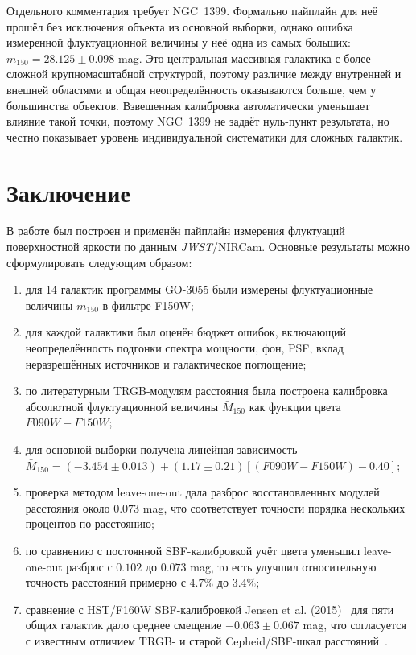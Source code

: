 \documentclass[12pt,a4paper]{article}
\begin{document}
Отдельного комментария требует NGC~1399. Формально пайплайн для неё прошёл без исключения объекта из основной выборки, однако ошибка измеренной флуктуационной величины у неё одна из самых больших: $\bar{m}_{150}=28.125\pm0.098$ mag. Это центральная массивная галактика с более сложной крупномасштабной структурой, поэтому различие между внутренней и внешней областями и общая неопределённость оказываются больше, чем у большинства объектов. Взвешенная калибровка автоматически уменьшает влияние такой точки, поэтому NGC~1399 не задаёт нуль-пункт результата, но честно показывает уровень индивидуальной систематики для сложных галактик.

\section{Заключение}

В работе был построен и применён пайплайн измерения флуктуаций поверхностной яркости по данным \textit{JWST}/NIRCam. Основные результаты можно сформулировать следующим образом:
\begin{enumerate}
    \item для 14 галактик программы GO-3055 были измерены флуктуационные величины $\bar{m}_{150}$ в фильтре F150W;
    \item для каждой галактики был оценён бюджет ошибок, включающий неопределённость подгонки спектра мощности, фон, PSF, вклад неразрешённых источников и галактическое поглощение;
    \item по литературным TRGB-модулям расстояния была построена калибровка абсолютной флуктуационной величины $\bar{M}_{150}$ как функции цвета $F090W-F150W$;
    \item для основной выборки получена линейная зависимость $\bar{M}_{150}=(-3.454\pm0.013)+(1.17\pm0.21)[(F090W-F150W)-0.40]$;
    \item проверка методом leave-one-out дала разброс восстановленных модулей расстояния около $0.073$ mag, что соответствует точности порядка нескольких процентов по расстоянию;
    \item по сравнению с постоянной SBF-калибровкой учёт цвета уменьшил leave-one-out разброс с $0.102$ до $0.073$ mag, то есть улучшил относительную точность расстояний примерно с $4.7\%$ до $3.4\%$;
    \item сравнение с HST/F160W SBF-калибровкой Jensen et al. (2015)~\cite{Jensen2015} для пяти общих галактик дало среднее смещение $-0.063\pm0.067$ mag, что согласуется с известным отличием TRGB- и старой Cepheid/SBF-шкал расстояний~\cite{Jensen2025}.
\end{enumerate}
\end{document}
